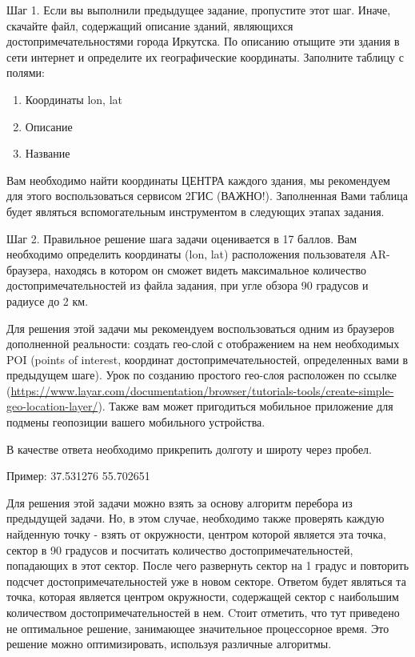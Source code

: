 
Шаг 1. Если вы выполнили предыдущее задание, пропустите этот шаг. Иначе, скачайте файл, содержащий описание зданий, являющихся достопримечательностями города Иркутска. По описанию отыщите эти здания в сети интернет и определите их географические координаты. Заполните таблицу с полями:

\begin{enumerate}
    \item Координаты lon, lat
    \item Описание
    \item Название
\end{enumerate}

Вам необходимо найти координаты ЦЕНТРА каждого здания, мы рекомендуем для этого воспользоваться сервисом 2ГИС (ВАЖНО!). Заполненная Вами таблица будет являться вспомогательным инструментом в следующих этапах задания.

Шаг 2. Правильное решение шага задачи оценивается в 17 баллов.  Вам необходимо определить координаты (lon, lat) расположения пользователя AR-браузера, находясь в котором он сможет видеть максимальное количество достопримечательностей из файла задания, при угле обзора 90 градусов и радиусе до 2 км.

Для решения этой задачи мы рекомендуем воспользоваться одним из браузеров дополненной реальности: создать гео-слой с отображением на нем необходимых POI (points of interest, координат достопримечательностей, определенных вами в предыдущем шаге). Урок по созданию простого гео-слоя 
расположен по ссылке (\url{https://www.layar.com/documentation/browser/tutorials-tools/create-simple-geo-location-layer/}). Также вам может пригодиться мобильное приложение для подмены геопозиции вашего мобильного устройства.

В качестве ответа необходимо прикрепить долготу и широту через пробел.

Пример:  37.531276 55.702651

\solutionSection

Для решения этой задачи можно взять за основу алгоритм перебора из предыдущей задачи. Но, в этом случае, необходимо также проверять каждую найденную точку - взять от окружности, центром которой является эта точка, сектор в 90 градусов и посчитать количество достопримечательностей, попадающих в этот сектор. После чего развернуть сектор на 1 градус и повторить подсчет достопримечательностей уже в новом секторе. Ответом будет являться та точка, которая является центром окружности, содержащей сектор с наибольшим количеством достопримечательностей в нем. Cтоит отметить, что тут приведено не оптимальное решение, занимающее значительное процессорное время. Это решение можно оптимизировать, используя различные алгоритмы.

